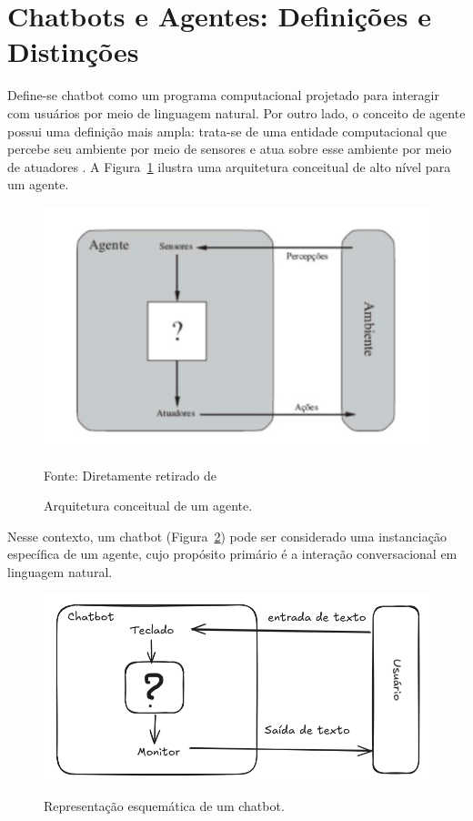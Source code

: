 \documentclass[14pt,a4paper,oneside]{book}
\begin{document}


\section{Chatbots e Agentes: Definições e Distinções}

Define-se chatbot como um programa computacional projetado para interagir com usuários por meio de linguagem natural. Por outro lado, o conceito de agente possui uma definição mais ampla: trata-se de uma entidade computacional que percebe seu ambiente por meio de sensores e atua sobre esse ambiente por meio de atuadores \cite{Russel2013}. A Figura~\ref{fig:agente} ilustra uma arquitetura conceitual de alto nível para um agente.

\begin{figure}
	\centering
	\caption{Arquitetura conceitual de um agente.}
	\includegraphics[width=0.7\linewidth]{fig/ia.png}
	\label{fig:agente}
	{\footnotesize \centering

		Fonte: Diretamente retirado de \cite{Russel2013}}
\end{figure}

Nesse contexto, um chatbot (Figura~\ref{fig:chatbot}) pode ser considerado uma instanciação específica de um agente, cujo propósito primário é a interação conversacional em linguagem natural.

\begin{figure}
	\centering
	\caption{Representação esquemática de um chatbot.}
	\includegraphics[width=0.9\linewidth]{fig/chatbot.png}
	\label{fig:chatbot}

\end{figure}
\end{document}
